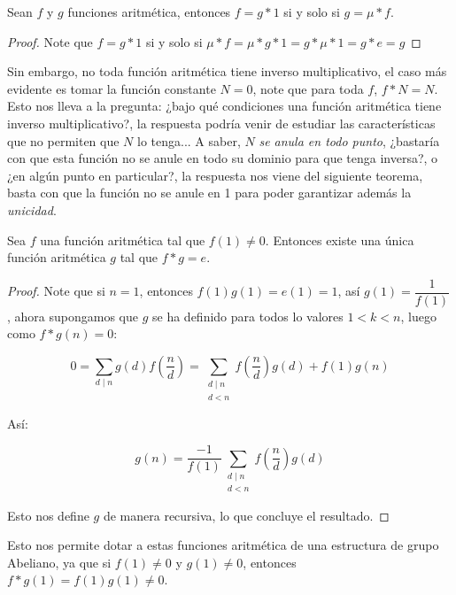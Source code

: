 \begin{theorem}
Sean $f$ y $g$ funciones aritmética, entonces $f=g*1$ si y solo si $g=\mu* f$.
\end{theorem}

\begin{proof}
Note que $f=g*1$ si y solo si $\mu*f=\mu*g*1=g*\mu*1=g*e=g$
\end{proof}

Sin embargo, no toda función aritmética tiene inverso multiplicativo, el caso más evidente es tomar la función constante $N=0$, note que para toda $f$, $f*N=N$. Esto nos lleva a la pregunta: ¿bajo qué condiciones una función aritmética tiene inverso multiplicativo?, la respuesta podría venir de estudiar las características que no permiten que $N$ lo tenga... A saber, $N$ \textit{se anula en todo punto}, ¿bastaría con que esta función no se anule en todo su dominio para que tenga inversa?, o ¿en algún punto en particular?, la respuesta nos viene del siguiente teorema, basta con que la función no se anule en 1 para poder garantizar además la \textit{unicidad}.

\begin{theorem}
 
Sea $f$ una función aritmética tal que $f(1) \neq 0$. Entonces existe una única función aritmética $g$ tal que $f*g=e$.

\end{theorem} 

\begin{proof}
Note que si $n=1$, entonces $f(1)g(1)=e(1)=1$, así $g(1)=\dfrac{1}{f(1)}$, ahora  supongamos que $g$ se ha definido para todos lo valores $1<k<n$, luego como $f*g(n)=0$:

\begin{equation}
0=\sum_{d\mid n}g(d)f \left( \frac{n}{d} \right)=\sum_{\substack{d \mid n \\
d<n}} f\left(\frac{n}{d}\right) g(d)+f(1) g(n)
\end{equation}

Así:

$$g(n) =\frac{-1}{f(1)} \sum_{\substack{d \mid n \\
d<n}} f\left(\frac{n}{d}\right) g(d)$$

Esto nos define $g$ de manera recursiva, lo que concluye el resultado.

\end{proof}


Esto nos permite dotar a estas funciones aritmética de una estructura de grupo Abeliano, ya que si $f(1)\neq 0$ y $g(1)\neq 0$, entonces $f*g(1)=f(1)g(1)\neq 0$.\\


